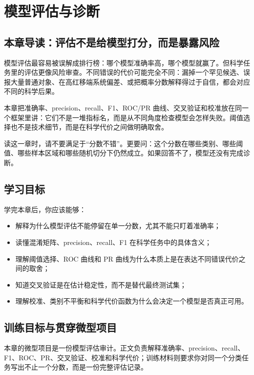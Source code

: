\chapter{模型评估与诊断}

\section{本章导读：评估不是给模型打分，而是暴露风险}

模型评估最容易被误解成排行榜：哪个模型准确率高，哪个模型就赢了。但科学任务里的评估更像风险审查。不同错误的代价可能完全不同：漏掉一个罕见候选、误报大量普通对象、在高红移端系统偏差、或把概率分数解释得过于自信，都会对应不同的科学后果。

本章把准确率、precision、recall、F1、ROC/PR 曲线、交叉验证和校准放在同一个框架里讲：它们不是一堆指标名，而是从不同角度检查模型会怎样失败。阈值选择也不是技术细节，而是在科学代价之间做明确取舍。

读这一章时，请不要满足于“分数不错”。更要问：这个分数在哪些类别、哪些阈值、哪些样本区域和哪些随机切分下仍然成立。如果回答不了，模型还没有完成诊断。

\section{学习目标}

学完本章后，你应该能够：

\begin{itemize}
    \item 解释为什么模型评估不能停留在单一分数，尤其不能只盯着准确率；
    \item 读懂混淆矩阵、precision、recall、F1 在科学任务中的具体含义；
    \item 理解阈值选择、ROC 曲线和 PR 曲线为什么本质上是在表达不同错误代价之间的取舍；
    \item 知道交叉验证是在估计稳定性，而不是替代最终测试集；
    \item 理解校准、类别不平衡和科学代价函数为什么会决定一个模型是否真正可用。
\end{itemize}

\section{训练目标与贯穿微型项目}

本章的微型项目是一份模型评估审计。正文负责解释准确率、precision、recall、F1、ROC、PR、交叉验证、校准和科学代价；训练材料则要求你对同一个分类任务写出不止一个分数，而是一份完整评估记录。

